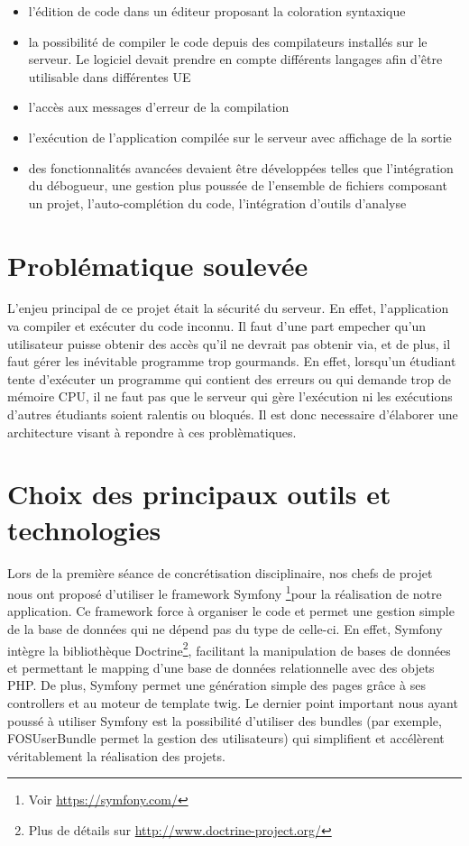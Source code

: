 \begin{itemize}

	\item l'édition de code dans un éditeur proposant la coloration syntaxique
	\item la possibilité de compiler le code depuis des compilateurs installés sur le serveur. Le logiciel devait prendre en compte différents langages afin d’être utilisable dans différentes UE
	\item l'accès aux messages d'erreur de la compilation
	\item l'exécution de l'application compilée sur le serveur avec affichage de la sortie
	\item des fonctionnalités avancées devaient être développées telles que l’intégration du débogueur, une gestion plus poussée de l’ensemble de fichiers composant un projet, l'auto-complétion du code, l'intégration d’outils d’analyse

\end{itemize}


\section{Problématique soulevée}

\par L'enjeu principal de ce projet était la sécurité du serveur. En effet, l'application va compiler et exécuter du code inconnu. Il faut d'une part empecher qu'un utilisateur puisse obtenir des accès qu'il ne devrait pas obtenir via, et de plus, il faut gérer les inévitable programme trop gourmands.  En effet, lorsqu'un étudiant tente d'exécuter un programme qui contient des erreurs ou qui demande trop de mémoire CPU, il ne faut pas que le serveur qui gère l'exécution ni les exécutions d'autres étudiants soient ralentis ou bloqués. Il est donc necessaire d'élaborer une architecture visant à repondre à ces problèmatiques.


\section{Choix des principaux outils et technologies}
\label{sec-principaux-outils}
\par Lors de la première séance de concrétisation disciplinaire, nos chefs de projet nous ont proposé d'utiliser le framework Symfony \footnote{Voir \url{https://symfony.com/}}pour la réalisation de notre application. Ce framework force à organiser le code et permet une gestion simple de la base de données qui ne dépend pas du type de celle-ci. En effet, Symfony intègre la bibliothèque Doctrine\footnote{Plus de détails sur \url{http://www.doctrine-project.org/}}, facilitant la manipulation de bases de données et permettant le mapping d'une base de données relationnelle avec des objets PHP. De plus, Symfony permet une génération simple des pages grâce à ses controllers et au moteur de template twig. Le dernier point important nous ayant poussé à utiliser Symfony est la possibilité d'utiliser des bundles (par exemple, FOSUserBundle permet la gestion des utilisateurs) qui simplifient et accélèrent véritablement la réalisation des projets.

